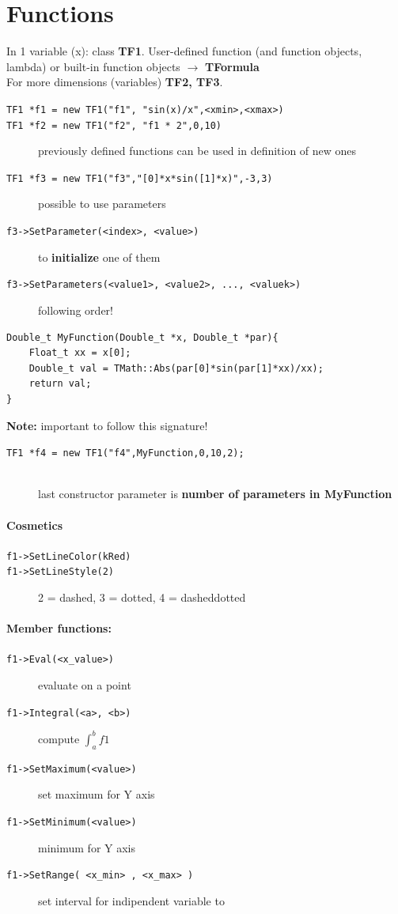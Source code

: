 \documentclass[10pt, oneside]{article}
\begin{document}
\section{Functions}
In 1 variable (x): class \textbf{TF1}. User-defined function (and function objects, lambda) or built-in function objects $\rightarrow$ \textbf{TFormula}
\\For more dimensions (variables) \textbf{TF2, TF3}.
\begin{description}
\item[\texttt{TF1 *f1 = new TF1("f1", "sin(x)/x",<xmin>,<xmax>)}]
\item[\texttt{TF1 *f2 = new TF1("f2", "f1 * 2",0,10)}] previously defined functions can be used in definition of new ones
\item[\texttt{TF1 *f3 = new TF1("f3","[0]*x*sin([1]*x)",-3,3)}] possible to use parameters
\item[\texttt{f3->SetParameter(<index>, <value>)}] to \textbf{initialize} one of them
\item[\texttt{f3->SetParameters(<value1>, <value2>, ..., <valuek>)}] following order!
\end{description}
\begin{verbatim}
Double_t MyFunction(Double_t *x, Double_t *par){ 
    Float_t xx = x[0];
    Double_t val = TMath::Abs(par[0]*sin(par[1]*xx)/xx); 
    return val;
}
\end{verbatim}
\textbf{Note:} important to follow this signature!
\begin{description}
\item[\texttt{TF1 *f4 = new TF1("f4",MyFunction,0,10,2);}] {}\,\\
last constructor parameter is \textbf{number of parameters in MyFunction}
\end{description}
\paragraph{Cosmetics}
\begin{description}
\item[\texttt{f1->SetLineColor(kRed)}]
\item[\texttt{f1->SetLineStyle(2)}] 2 = dashed, 3 = dotted, 4 = dasheddotted
\end{description}
\paragraph{Member functions:}
\begin{description}
\item[\texttt{f1->Eval(<x\_value>)}] evaluate on a point
\item[\texttt{f1->Integral(<a>, <b>)}] compute $\displaystyle \int_a^b f1$
\item[\texttt{f1->SetMaximum(<value>)}] set maximum for Y axis
\item[\texttt{f1->SetMinimum(<value>)}] minimum for Y axis
\item[\texttt{f1->SetRange( <x\_min> , <x\_max> )}] set interval for indipendent variable to \texttt{}
\end{description}
\end{document}
